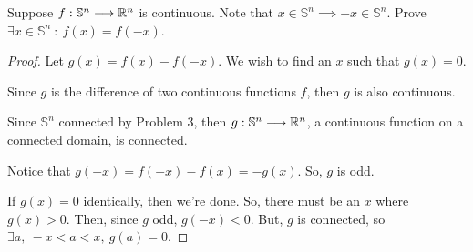 \documentclass[../hw3]{subfiles}
\begin{document}
\begin{problem}[4]
Suppose $f:\mathbb{S}^{n}\longrightarrow\mathbb{R}^{n}$ is continuous. Note that $x\in \mathbb{S}^{n}\implies-x\in \mathbb{S}^{n}$. Prove $\exists x\in \mathbb{S}^{n}\ :\ f(x)=f(-x)$.
\end{problem}
\begin{proof}
	Let $g(x)=f(x)-f(-x)$. We wish to find an $x$ such that $g(x)=0$.

	Since $g$ is the difference of two continuous functions $f$, then  $g$ is also continuous.

	Since $\mathbb{S}^{n}$ connected by Problem 3, then $g:\mathbb{S}^{n}\longrightarrow\mathbb{R}^{n}$, a continuous function on a connected domain, is connected.

	Notice that $g(-x)=f(-x)-f(x)=-g(x)$. So, $g$ is odd.

	If $g(x)=0$ identically, then we're done. So, there must be an $x$ where $g(x)>0$. Then, since $g$ odd, $g(-x)<0$. But, $g$ is connected, so  $\exists a,\ -x<a<x,\ g(a)=0$.
\end{proof}
\end{document}
